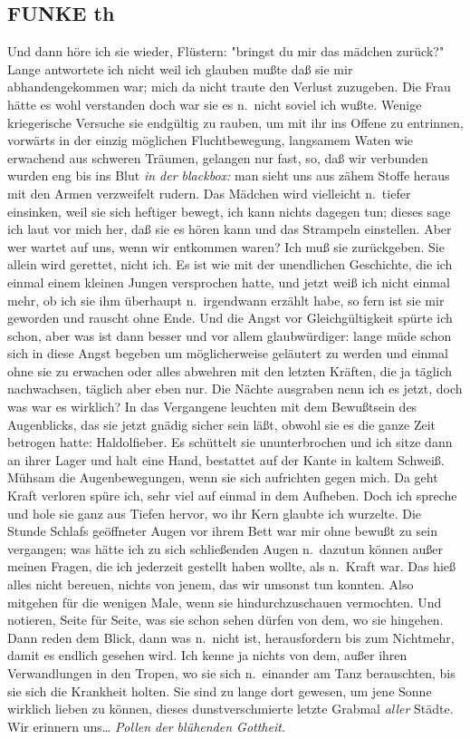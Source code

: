 \documentclass[
]{article}
\author{}
\date{\vspace{-2.5em}}
\begin{document}
\subsection{FUNKE th}\label{funke-th}

Und dann höre ich sie wieder, Flüstern: "bringst du mir das mädchen
zurück?"\\
Lange antwortete ich nicht weil ich glauben mußte daß sie mir
abhandengekommen war; mich da nicht traute den Verlust zuzugeben. Die
Frau hätte es wohl verstanden doch war sie es n.~nicht soviel ich wußte.
Wenige kriegerische Versuche sie endgültig zu rauben, um mit ihr ins
Offene zu entrinnen, vorwärts in der einzig möglichen Fluchtbewegung,
langsamem Waten wie erwachend aus schweren Träumen, gelangen nur fast,
so, daß wir verbunden wurden eng bis ins Blut \emph{in der blackbox:
}man sieht uns aus zähem Stoffe heraus mit den Armen verzweifelt rudern.
Das Mädchen wird vielleicht n.~tiefer einsinken, weil sie sich heftiger
bewegt, ich kann nichts dagegen tun; dieses sage ich laut vor mich her,
daß sie es hören kann und das Strampeln einstellen. Aber wer wartet auf
uns, wenn wir entkommen waren? Ich muß sie zurückgeben. Sie allein wird
gerettet, nicht ich. Es ist wie mit der unendlichen Geschichte, die ich
einmal einem kleinen Jungen versprochen hatte, und jetzt weiß ich nicht
einmal mehr, ob ich sie ihm überhaupt n.~irgendwann erzählt habe, so
fern ist sie mir geworden und rauscht ohne Ende. Und die Angst vor
Gleichgültigkeit spürte ich schon, aber was ist dann besser und vor
allem glaubwürdiger: lange müde schon sich in diese Angst begeben um
möglicherweise geläutert zu werden und einmal ohne sie zu erwachen oder
alles abwehren mit den letzten Kräften, die ja täglich nachwachsen,
täglich aber eben nur. Die Nächte ausgraben nenn ich es jetzt, doch was
war es wirklich? In das Vergangene leuchten mit dem Bewußtsein des
Augenblicks, das sie jetzt gnädig sicher sein läßt, obwohl sie es die
ganze Zeit betrogen hatte: Haldolfieber. Es schüttelt sie ununterbrochen
und ich sitze dann an ihrer Lager und halt eine Hand, bestattet auf der
Kante in kaltem Schweiß. Mühsam die Augenbewegungen, wenn sie sich
aufrichten gegen mich. Da geht Kraft verloren spüre ich, sehr viel auf
einmal in dem Aufheben. Doch ich spreche und hole sie ganz aus Tiefen
hervor, wo ihr Kern glaubte ich wurzelte. Die Stunde Schlafs geöffneter
Augen vor ihrem Bett war mir ohne bewußt zu sein vergangen; was hätte
ich zu sich schließenden Augen n.~dazutun können außer meinen Fragen,
die ich jederzeit gestellt haben wollte, als n.~Kraft war. Das hieß
alles nicht bereuen, nichts von jenem, das wir umsonst tun konnten. Also
mitgehen für die wenigen Male, wenn sie hindurchzuschauen vermochten.
Und notieren, Seite für Seite, was sie schon sehen dürfen von dem, wo
sie hingehen. Dann reden dem Blick, dann was n.~nicht ist, herausfordern
bis zum Nichtmehr, damit es endlich gesehen wird. Ich kenne ja nichts
von dem, außer ihren Verwandlungen in den Tropen, wo sie sich
n.~einander am Tanz berauschten, bis sie sich die Krankheit holten. Sie
sind zu lange dort gewesen, um jene Sonne wirklich lieben zu können,
dieses dunstverschmierte letzte Grabmal \emph{aller} Städte. Wir
erinnern uns\ldots{} \emph{Pollen der blühenden Gottheit}.
\end{document}
